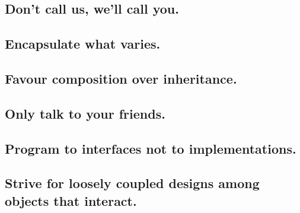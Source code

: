 \documentclass{beamer}
\begin{document}
\begin{frame}{}
\end{frame}

\subsection{Don't call us, we'll call you.}

\begin{frame}{}
\end{frame}

\subsection{Encapsulate what varies.}

\begin{frame}{}
\end{frame}

\subsection{Favour composition over inheritance.}

\begin{frame}{}
\end{frame}

\subsection{Only talk to your friends.}

\begin{frame}{}
\end{frame}

\subsection{Program to interfaces not to implementations.}

\begin{frame}{}
\end{frame}

\subsection{Strive for loosely coupled designs among objects that interact.}

\begin{frame}{}
\end{frame}
\end{document}
